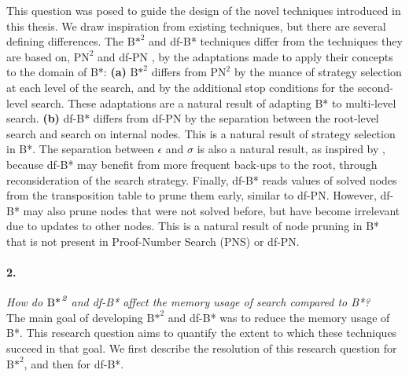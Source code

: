 \vspace{-1ex}
\noindent This question was posed to guide the design of the novel techniques introduced in this thesis.
We draw inspiration from existing techniques, but there are several defining differences.
The ${\text{B*}}^2$ and df-B* techniques differ from the techniques they are based on, ${\text{PN}}^2$ \cite{Breuker1998} and df-PN \cite{Nagai2002}, by the adaptations made to apply their concepts to the domain of B*:
\textbf{(a)} ${\text{B*}}^2$ differs from ${\text{PN}}^2$ by the nuance of strategy selection at each level of the search, and by the additional stop conditions for the second-level search. These adaptations are a natural result of adapting B* to multi-level search.
\textbf{(b)} df-B* differs from df-PN by the separation between the root-level search and search on internal nodes. This is a natural result of strategy selection in B*. The separation between $\epsilon$ and $\sigma$ is also a natural result, as inspired by , because df-B* may benefit from more frequent back-ups to the root, through reconsideration of the search strategy. Finally, df-B* reads values of solved nodes from the transposition table to prune them early, similar to df-PN. However, df-B* may also prune nodes that were not solved before, but have become irrelevant due to updates to other nodes. This is a natural result of node pruning in B* that is not present in Proof-Number Search (PNS) or df-PN.

\paragraph{2.} \textit{How do ${\text{B*}}^{\text{\hspace{1pt}}\textit{2}}$ and df-B* affect the memory usage of search compared to B*?}\\

\vspace{-1ex}
\noindent The main goal of developing ${\text{B*}}^2$ and df-B* was to reduce the memory usage of B*. This research question aims to quantify the extent to which these techniques succeed in that goal. We first describe the resolution of this research question for ${\text{B*}}^2$, and then for df-B*.\\

